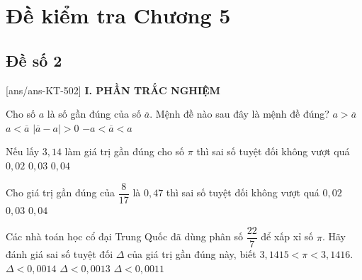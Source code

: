 \section*{Đề kiểm tra Chương 5}
\subsection*{Đề số 2}
\setcounter{ex}{0}\setcounter{bt}{0}
[ans/ans-KT-502]
\noindent\textbf{I. PHẦN TRẮC NGHIỆM}
\begin{ex}%
	Cho số $a$ là số gần đúng của số $\overline{a}$. Mệnh đề nào sau đây là mệnh đề đúng?
	\choice
	{$a>\overline{a}$}               
	{$a<\overline{a}$}
	{\True $|\overline{a}-a|>0$}
	{$-a<\overline{a}<a$}
\end{ex}

\begin{ex}%
	Nếu lấy $3{,}14$ làm giá trị gần đúng cho số $\pi$ thì sai số tuyệt đối không vượt quá  
	{$0{,}02$}
	{$0{,}03$}
	{$0{,}04$}
\end{ex}

\begin{ex}%
	Cho giá trị gần đúng của $\dfrac{8}{17}$ là $0{,}47$ thì sai số tuyệt đối không vượt quá 
	{$0{,}02$}
	{$0{,}03$}
	{$0{,}04$}
\end{ex}

\begin{ex}%
	Các nhà toán học cổ đại Trung Quốc đã dùng phân số $\dfrac{22}{7}$ để xấp xỉ số $\pi$. Hãy đánh giá sai số tuyệt đối $\Delta$ của giá trị gần đúng này, biết $3{,}1415<\pi<3{,}1416$.
	{\True$\Delta<0{,}0014$}
	{$\Delta<0{,}0013$}
	{$\Delta<0{,}0011$}
\end{ex}

